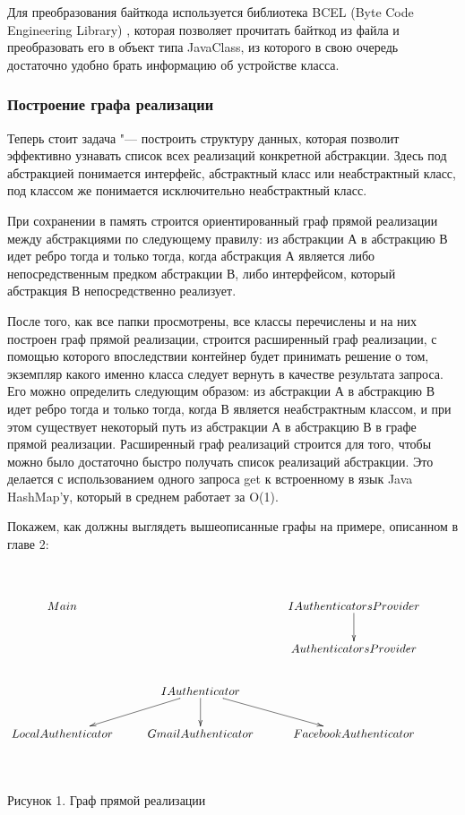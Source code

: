 Для преобразования байткода используется библиотека BCEL (Byte Code Engineering Library) \cite{bcel}, которая позволяет прочитать байткод из файла и преобразовать его в объект типа JavaClass, 
из которого в свою очередь достаточно удобно брать информацию об устройстве класса.

\subsubsection{Построение графа реализации}
Теперь стоит задача "--- построить структуру данных, которая позволит эффективно узнавать список всех реализаций конкретной абстракции.
Здесь под абстракцией понимается интерфейс, абстрактный класс или неабстрактный класс, под классом же понимается исключительно неабстрактный класс.

При сохранении в память строится ориентированный граф прямой реализации между абстракциями по следующему правилу: из абстракции А в абстракцию В идет ребро тогда и только тогда, 
когда абстракция А является либо непосредственным предком абстракции В, либо интерфейсом, который абстракция В непосредственно реализует.

После того, как все папки просмотрены, все классы перечислены и на них построен граф прямой реализации, строится расширенный граф реализации, 
с помощью которого впоследствии контейнер будет принимать решение о том, экземпляр какого именно класса следует вернуть в качестве результата запроса. 
Его можно определить следующим образом: из абстракции А в абстракцию В идет ребро тогда и только тогда, когда В является неабстрактным классом,
и при этом существует некоторый путь из абстракции А в абстракцию В в графе прямой реализации. 
Расширенный граф реализаций строится для того, чтобы можно было достаточно быстро получать список реализаций абстракции. Это делается с использованием одного запроса get к 
встроенному в язык Java HashMap'у, который в среднем работает за O(1).


Покажем, как должны выглядеть вышеописанные графы на примере, описанном в главе 2:


\begin{center}
	$\xymatrix{
	\\
	Main & & IAuthenticatorsProvider \ar@{->}[d] \\
	 & & AuthenticatorsProvider \\
	 & IAuthenticator \ar@{->}[d] \ar@{->}[dl] \ar@{->}[dr]& \\
	LocalAuthenticator & GmailAuthenticator & FacebookAuthenticator \\
	 & & & 
	}$
\end{center}
\begin{center}
Рисунок 1. Граф прямой реализации
\end{center}

